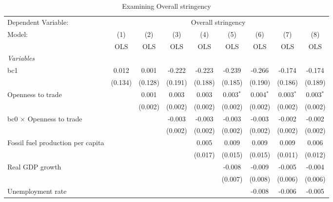 
\begin{table}[htbp]
   \caption{Examining Overall stringency}
   \centering
   \begin{tabular}{lcccccccc}
      \toprule
      Dependent Variable: & \multicolumn{8}{c}{Overall stringency}\\
      Model:                                  & (1)     & (2)     & (3)     & (4)     & (5)         & (6)         & (7)         & (8)\\  
                                              &  OLS    & OLS     & OLS     & OLS     & OLS         & OLS         & OLS         & OLS\\  
      \midrule
      \emph{Variables}\\
      bc1                                     & 0.012   & 0.001   & -0.222  & -0.223  & -0.239      & -0.266      & -0.174      & -0.174\\   
                                              & (0.134) & (0.128) & (0.191) & (0.188) & (0.185)     & (0.190)     & (0.186)     & (0.189)\\   
      Openness to trade                       &         & 0.001   & 0.003   & 0.003   & 0.003$^{*}$ & 0.004$^{*}$ & 0.003$^{*}$ & 0.003$^{*}$\\   
                                              &         & (0.002) & (0.002) & (0.002) & (0.002)     & (0.002)     & (0.002)     & (0.002)\\   
      bc0 $\times$ Openness to trade          &         &         & -0.003  & -0.003  & -0.003      & -0.003      & -0.002      & -0.002\\   
                                              &         &         & (0.002) & (0.002) & (0.002)     & (0.002)     & (0.002)     & (0.002)\\   
      Fossil fuel production per capita       &         &         &         & 0.005   & 0.009       & 0.009       & 0.009       & 0.006\\   
                                              &         &         &         & (0.017) & (0.015)     & (0.015)     & (0.011)     & (0.012)\\   
      Real GDP growth                         &         &         &         &         & -0.008      & -0.009      & -0.005      & -0.004\\   
                                              &         &         &         &         & (0.007)     & (0.008)     & (0.006)     & (0.006)\\   
      Unemployment rate                       &         &         &         &         &             & -0.008      & -0.006      & -0.005\\   

\end{tabular}
\end{table}
